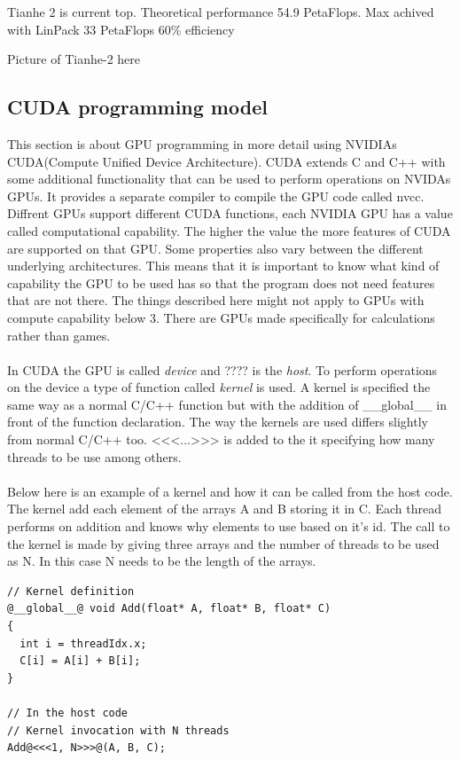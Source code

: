 \documentclass[10pt,a4paper]{report}
\begin{document}
Tianhe 2 is current top. Theoretical performance 54.9 PetaFlops.\cite{TOP500}
Max achived with LinPack 33 PetaFlops
60\% efficiency

Picture of Tianhe-2 here

\subsection{CUDA programming model}
This section is about GPU programming in more detail using NVIDIAs CUDA(Compute Unified Device Architecture)\cite{cuda}. CUDA extends C and C++ with some additional functionality that can be used to perform operations on NVIDAs GPUs. It provides a separate compiler to compile the GPU code called nvcc. Diffrent GPUs support different CUDA functions, each NVIDIA GPU has a value called computational capability. The higher the value the more features of CUDA are supported on that GPU. Some properties also vary between the different underlying architectures. This means that it is important to know what kind of capability the GPU to be used has so that the program does not need features that are not there. The things described here might not apply to GPUs with compute capability below 3. There are GPUs made specifically for calculations rather than games.\cite{cuda}\\
\\
In CUDA the GPU is called \emph{device} and ???? is the \emph{host}. To perform operations on the device a type of function called \emph{kernel} is used. A kernel is specified the same way as a normal C/C++ function but with the addition of \_\_global\_\_ in front of the function declaration. The way the kernels are used differs slightly from normal C/C++ too. <<<...>>> is added to the it specifying how many threads to be use among others.\cite{cuda}\\
\\
Below here is an example of a kernel and how it can be called from the host code. The kernel add each element of the arrays A and B storing it in C. Each thread performs on addition and knows why elements to use based on it's id. The call to the kernel is made by giving three arrays and the number of threads to be used as N. In this case N needs to be the length of the arrays.
\begin{lstlisting}
// Kernel definition
@__global__@ void Add(float* A, float* B, float* C)
{
  int i = threadIdx.x;
  C[i] = A[i] + B[i];
}

// In the host code
// Kernel invocation with N threads
Add@<<<1, N>>>@(A, B, C);
\end{lstlisting}
\end{document}

